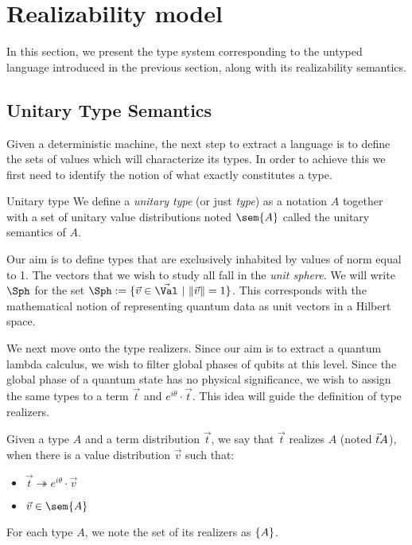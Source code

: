 \section{Realizability model}

In this section, we present the type system corresponding to the untyped language introduced in the previous section, along with its realizability semantics.

\subsection{Unitary Type Semantics}

Given a deterministic machine, the next step to extract a language is to define the sets of values which will characterize its types. In order to achieve this we first need to identify the notion of what exactly constitutes a type.

\begin{definition}{Unitary type}
  We define a \textit{unitary type} (or just \textit{type}) as a notation $A$ together with a set of unitary value distributions noted $\sem{A}$ called the unitary semantics of $A$.
\end{definition}

Our aim is to define types that are exclusively inhabited by values of norm equal to 1. The vectors that we wish to study all fall in the \emph{unit sphere}. We will write $\Sph$ for the set $\Sph := \{\vec v \in \vec{\Val}~|~\|\vec v\| =1\}$. This corresponds with the mathematical notion of representing quantum data as unit vectors in a Hilbert space. 

We next move onto the type realizers. Since our aim is to extract a quantum lambda calculus, we wish to filter global phases of qubits at this level. Since the global phase of a quantum state has no physical significance, we wish to assign the same types to a term $\vec{t}$ and $e^{i\theta}\cdot\vec{t}$. This idea will guide the definition of type realizers.

\begin{definition}
  Given a type $A$ and a term distribution $\vec t$, we say that $\vec t$ realizes $A$ (noted $\vec t \real A$), when there is a value distribution $\vec v$ such that:
  \begin{itemize}
    \item $\vec{t}\twoheadrightarrow e^{i\theta}\cdot\vec{v}$
    \item $\vec{v}\in\sem{A}$
  \end{itemize}
  For each type $A$, we note the set of its realizers as $\{\real A\}$.
\end{definition}

